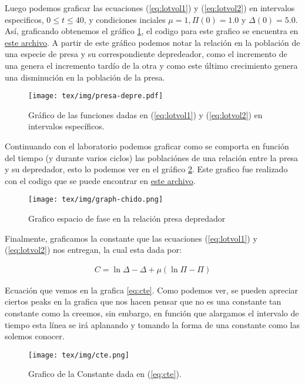 \documentclass[../portafolio.tex]{subfiles}
\begin{document}
Luego podemos graficar las ecuaciones (\ref{eq:lotvol1}) y (\ref{eq:lotvol2}) en intervalos especificos, $0 \leq t \leq 40$, y condiciones inciales $\mu = 1, \Pi(0) = 1.0 $ y $\Delta(0) = 5.0$. As\'i, graficando obtenemos el gr\'afico \ref{graph:presa-depre}, el codigo para este grafico se encuentra en \href{run:src/lab04.py}{este archivo}. A partir de este gr\'afico podemos notar la relaci\'on en la poblaci\'on de una especie de presa y su correspondiente depredeador, como el incremento de una genera el incremento tard\'io de la otra y como este \'ultimo crecimiento genera una disminuci\'on en la poblaci\'on de la presa.

\begin{figure}
\centering
	\texttt{[image: tex/img/presa-depre.pdf]}
	\caption{Gr\'afico de las funciones dadas en (\ref{eq:lotvol1}) y (\ref{eq:lotvol2}) en intervalos espec\'ificos.}
	\label{graph:presa-depre}
\end{figure}

Continuando con el laboratorio podemos graficar como se comporta en funci\'on del tiempo (y durante varios ciclos) las poblaci\'ones de una relaci\'on entre la presa y su depredador, esto lo podemos ver en el gr\'afico \ref{graph:chingon}. Este grafico fue realizado con el codigo que se puede encontrar en \href{run:src/graph-chido-edos.py}{este archivo}.

\begin{figure}
\centering
	\texttt{[image: tex/img/graph-chido.png]}
	\caption{Grafico espacio de fase en la relaci\'on presa depredador}
	\label{graph:chingon}
\end{figure}

Finalmente, graficamos la constante que las ecuaciones (\ref{eq:lotvol1}) y (\ref{eq:lotvol2}) nos entregan, la cual esta dada por:

\begin{align}
	C = \ln \Delta - \Delta + \mu (\ln \Pi - \Pi) \label{eq:cte}
\end{align}

Ecuaci\'on que vemos en la grafica \ref{eq:cte}. Como podemos ver, se pueden apreciar ciertos peaks en la grafica que nos hacen pensar que no es una constante tan constante como la creemos, sin embargo, en funci\'on que alargamos el intervalo de tiempo esta l\'inea se ir\'a aplanando y tomando la forma de una constante como las solemos conocer.

\begin{figure}
\centering
	\texttt{[image: tex/img/cte.png]}
	\caption{Grafico de la Constante dada en (\ref{eq:cte}).}
\end{figure}
\end{document}
